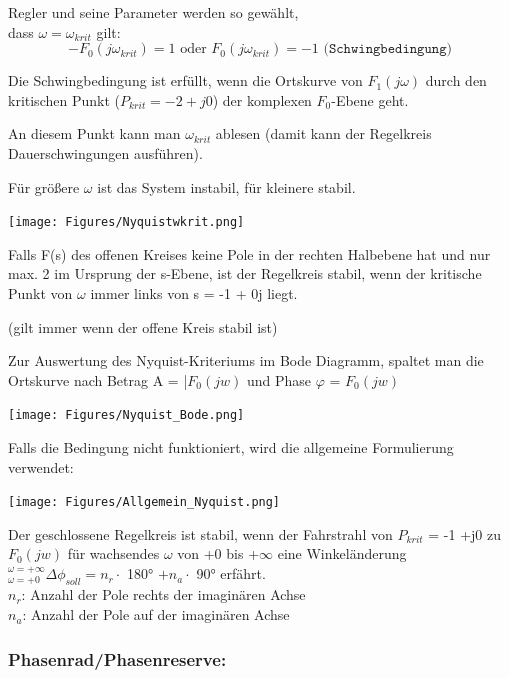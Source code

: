 \documentclass[10pt,a4paper]{article}
\begin{document}
Regler und seine Parameter werden so gewählt,\\ dass $\omega = \omega_{krit}$ gilt:
\[
	-F_0 (j\omega_{krit})=1 \text{ oder } F_0 (j\omega_{krit})=-1 \texttt{ (Schwingbedingung)}
\]

\begin{mdframed}[style=exercise]
	Die Schwingbedingung ist erfüllt, wenn die Ortskurve von $F_1 (j\omega)$
	durch den kritischen Punkt ($P_{krit} = -2+j0$) der komplexen $F_0$-Ebene
	geht.

	An diesem Punkt kann man $\omega_{krit}$ ablesen (damit kann der Regelkreis
	Dauerschwingungen ausführen).

	Für größere $\omega$ ist das System instabil, für kleinere stabil.
\end{mdframed}

\texttt{[image: Figures/Nyquistwkrit.png]}

\begin{mdframed}[style=exercise]
	Falls F(s) des offenen Kreises keine Pole in der rechten Halbebene hat und
	nur max. 2 im Ursprung der s-Ebene, ist der Regelkreis stabil, wenn der
	kritische Punkt von $\omega$ immer links von s = -1 + 0j liegt.

	\footnotesize
	(gilt immer wenn der offene Kreis stabil ist)
\end{mdframed}

Zur Auswertung des Nyquist-Kriteriums im Bode Diagramm, spaltet man die Ortskurve nach Betrag
A = |$F_0 (jw)$ und Phase $\varphi$ = $F_0(jw)$

\texttt{[image: Figures/Nyquist\_Bode.png]}

Falls die Bedingung nicht funktioniert, wird die allgemeine Formulierung verwendet:

\texttt{[image: Figures/Allgemein\_Nyquist.png]}

\begin{mdframed}[style=exercise]
	Der geschlossene Regelkreis ist stabil, wenn der Fahrstrahl von $P_{krit}$ = -1 +j0
	zu $F_0 (jw)$ für wachsendes $\omega$ von +0 bis +$\infty$ eine Winkeländerung
	$^{\omega=+\infty}_{\omega=+0} \Delta \phi _{soll} = n_r \cdot$ 180° $+n_a \cdot$ 90°
	erfährt.\\
	$n_r$: Anzahl der Pole rechts der imaginären Achse\\
	$n_a$: Anzahl der Pole auf der imaginären Achse
\end{mdframed}

\subsubsection{Phasenrad/Phasenreserve:}
\end{document}
